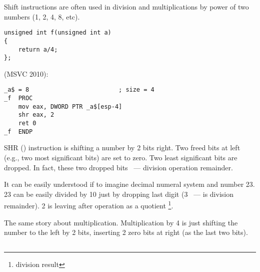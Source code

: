 

{Shift instructions are often used in division and multiplications by power of two numbers (1, 2, 4, 8, etc).}


\begin{lstlisting}
unsigned int f(unsigned int a)
{
	return a/4;
};
\end{lstlisting}

 (MSVC 2010):

\begin{lstlisting}
_a$ = 8							; size = 4
_f	PROC
	mov	eax, DWORD PTR _a$[esp-4]
	shr	eax, 2
	ret	0
_f	ENDP
\end{lstlisting}

\label{SHR}
{SHR () instruction is shifting a number by 2 bits right.
Two freed bits at left (e.g., two most significant bits) are set to zero.
Two least significant bits are dropped.
In fact, these two dropped bits ~--- division operation remainder.}

{It can be easily understood if to imagine decimal numeral system and number 23.
23 can be easily divided by 10 just by dropping last digit (3 ~--- is division remainder). 
2 is leaving after operation as a quotient
\footnote{division result}.}

{The same story about multiplication. Multiplication by 4 is just shifting the number to the left by 2 bits,
inserting 2 zero bits at right (as the last two bits).}

\subsection{}

